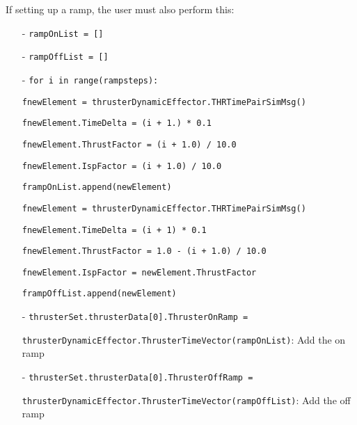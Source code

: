 If setting up a ramp, the user must also perform this:

\begin{itemize}
 \item[-]      \texttt{rampOnList = []}
 \item[-]      \texttt{rampOffList = []}

 \item[-]      \texttt{for i in range(rampsteps):}
 
\hspace{2cm}\texttt{fnewElement = thrusterDynamicEffector.THRTimePairSimMsg()}

\hspace{2cm}\texttt{fnewElement.TimeDelta = (i + 1.) * 0.1}

\hspace{2cm}\texttt{fnewElement.ThrustFactor = (i + 1.0) / 10.0}

\hspace{2cm}\texttt{fnewElement.IspFactor = (i + 1.0) / 10.0}

\hspace{2cm}\texttt{frampOnList.append(newElement)}

\hspace{2cm}\texttt{fnewElement = thrusterDynamicEffector.THRTimePairSimMsg()}

\hspace{2cm}\texttt{fnewElement.TimeDelta = (i + 1) * 0.1}

\hspace{2cm}\texttt{fnewElement.ThrustFactor = 1.0 - (i + 1.0) / 10.0}

 \hspace{2cm}\texttt{fnewElement.IspFactor = newElement.ThrustFactor}
 
 \hspace{2cm}\texttt{frampOffList.append(newElement)}

 \item[-]      \texttt{thrusterSet.thrusterData[0].ThrusterOnRamp =}
 
  \texttt{thrusterDynamicEffector.ThrusterTimeVector(rampOnList)}: Add the on ramp
 \item[-]      \texttt{thrusterSet.thrusterData[0].ThrusterOffRamp =}
 
 \texttt{thrusterDynamicEffector.ThrusterTimeVector(rampOffList)}: Add the off ramp
            
            \end{itemize}
